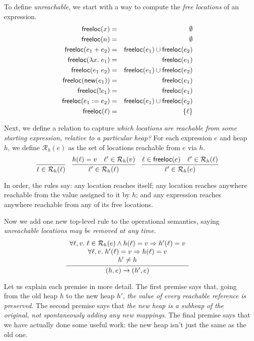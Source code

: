 \documentclass{amsbook}
\theoremstyle{definition}
\theoremstyle{remark}
\numberwithin{section}{chapter}
\numberwithin{equation}{chapter}
\begin{document}
\newcommand{\freeloc}[1]{\mathsf{freeloc}(#1)}

To define \emph{unreachable}, we start with a way to compute the \emph{free locations} of an expression.
\begin{eqnarray*}
  \freeloc{x} &=& \emptyset \\
  \freeloc{n} &=& \emptyset \\
  \freeloc{e_1 + e_2} &=& \freeloc{e_1} \cup \freeloc{e_2} \\
  \freeloc{\lambda x. \; e_1} &=& \freeloc{e_1} \\
  \freeloc{e_1 \; e_2} &=& \freeloc{e_1} \cup \freeloc{e_2} \\
  \freeloc{\newref{e_1}} &=& \freeloc{e_1} \\
  \freeloc{\readref{e_1}} &=& \freeloc{e_1} \\
  \freeloc{\writeref{e_1}{e_2}} &=& \freeloc{e_1} \cup \freeloc{e_2} \\
  \freeloc{\ell} &=& \{\ell\}
\end{eqnarray*}

\newcommand{\reach}[2]{\mathcal R_{#1}(#2)}

Next, we define a relation to capture \emph{which locations are reachable from some starting expression, relative to a particular heap?}
For each expression $e$ and heap $h$, we define $\reach{h}{e}$ as the set of locations reachable from $e$ via $h$.
$$\infer{\ell \in \reach{h}{\ell}}{}
\quad \infer{\ell' \in \reach{h}{\ell}}{
  \msel{h}{\ell} = v
  & \ell' \in \reach{h}{v}
}
\quad \infer{\ell' \in \reach{h}{e}}{
  \ell \in \freeloc{e}
  & \ell' \in \reach{h}{\ell}
}$$

In order, the rules say: any location reaches itself; any location reaches anywhere reachable from the value assigned to it by $h$; and any expression reaches anywhere reachable from any of its free locations.

Now we add one new top-level rule to the operational semantics, saying \emph{unreachable locations may be removed at any time}.
$$\infer{\smallstep{(h, e)}{(h', e)}}{
  \begin{array}{c}
    \forall \ell, v. \; \ell \in \reach{h}{e} \land \msel{h}{\ell} = v \Rightarrow \msel{h'}{\ell} = v \\
    \forall \ell, v. \; \msel{h'}{\ell} = v \Rightarrow \msel{h}{\ell} = v \\
    h' \neq h
  \end{array}
}$$

Let us explain each premise in more detail.
The first premise says that, going from the old heap $h$ to the new heap $h'$, \emph{the value of every reachable reference is preserved}.
The second premise says that \emph{the new heap is a subheap of the original, not spontaneously adding any new mappings}.
The final premise says that we have actually done some useful work: the new heap isn't just the same as the old one.
\end{document}
